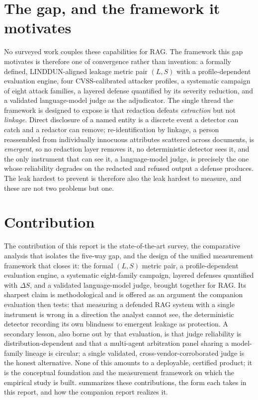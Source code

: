 \documentclass[12pt,a4paper]{report}
\begin{document}
\section{The gap, and the framework it motivates}
\label{sec:concl-answer}

No surveyed work couples these capabilities for RAG. The framework this gap motivates is therefore
one of convergence rather than invention: a formally defined, LINDDUN-aligned leakage metric pair
$(L,S)$ with a profile-dependent evaluation engine, four CVSS-calibrated attacker profiles, a
systematic campaign of eight attack families, a layered defense quantified by its severity
reduction, and a validated language-model judge as the adjudicator. The single thread the framework
is designed to expose is that redaction defeats \emph{extraction} but not \emph{linkage}. Direct
disclosure of a named entity is a discrete event a detector can catch and a redactor can remove;
re-identification by linkage, a person reassembled from individually innocuous attributes scattered
across documents, is \emph{emergent}, so no redaction layer removes it, no deterministic detector
sees it, and the only instrument that can see it, a language-model judge, is precisely the one whose
reliability degrades on the redacted and refused output a defense produces. The leak hardest to
prevent is therefore also the leak hardest to measure, and these are not two problems but one.

\section{Contribution}
\label{sec:concl-contribution}

The contribution of this report is the state-of-the-art survey, the comparative analysis that
isolates the five-way gap, and the design of the unified measurement framework that closes it: the
formal $(L,S)$ metric pair, a profile-dependent evaluation engine, a systematic eight-family
campaign, layered defenses quantified with $\Delta S$, and a validated language-model judge, brought
together for RAG. Its sharpest claim is methodological and is offered as an argument the companion
evaluation then tests: that measuring a defended RAG system with a single instrument is wrong in a
direction the analyst cannot see, the deterministic detector recording its own blindness to emergent
leakage as protection. A secondary lesson, also borne out by that evaluation, is that judge
reliability is distribution-dependent and that a multi-agent arbitration panel sharing a
model-family lineage is circular; a single validated, cross-vendor-corroborated judge is the honest
alternative. None of this amounts to a deployable, certified product; it is the conceptual
foundation and the measurement framework on which the empirical study is built.
 summarizes these contributions, the form each takes in this report, and how
the companion report realizes it.
\end{document}
